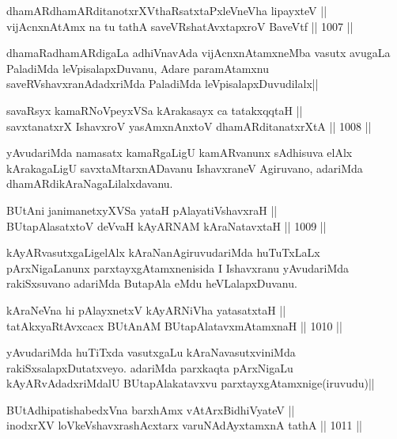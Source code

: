 \begin{shl}
dhamARdhamARditanotxrXV\s thaRsatxtaPxleVneVha lipayxteV || \\
vijAcnxnAtAmx na tu tathA saveVRshatAvxtapxroV BaveVtf ||  1007 ||  
\end{shl}

\begin{artha}
dhamaRadhamARdigaLa adhiVnavAda vijAcnxnAtamxneMba vasutx avugaLa PaladiMda leVpisalapxDuvanu, Adare paramAtamxnu saveRVshavxranAdadxriMda PaladiMda leVpisalapxDuvudilalx||
\end{artha}

\begin{shl}
savaRsyx kamaRNoV\s peyxVSa kArakasayx ca tatakxqqtaH || \\
savxtanatxrX IshavxroV yasAmxnAnxtoV dhamARditanatxrXtA ||  1008 ||  
\end{shl}

\begin{artha}
yAvudariMda namasatx kamaRgaLigU kamARvanunx sAdhisuva elAlx kArakagaLigU savxtaMtarxnADavanu IshavxraneV Agiruvano, adariMda dhamARdikAraNagaLilalxdavanu.
\end{artha}

\begin{shl}
BUtAni janimanetxyXVSa yataH pAlayatiVshavxraH || \\
BUtapAlasatxtoV deVvaH kAyARNAM kAraNatavxtaH ||  1009 ||  
\end{shl}

\begin{artha}
kAyARvasutxgaLigelAlx kAraNanAgiruvudariMda huTuTxLaLx pArxNigaLanunx parxtayxgAtamxnenisida I Ishavxranu yAvudariMda rakiSxsuvano adariMda ButapAla eMdu heVLalapxDuvanu.
\end{artha}


\begin{shl}
kAraNeVna hi pAlayxnetxV kAyARNiVha yatasatxtaH || \\
tatAkxyaRtAvxcacx BUtAnAM BUtapAlatavxmAtamxnaH ||  1010 ||  
\end{shl}

\begin{artha}
yAvudariMda huTiTxda vasutxgaLu kAraNavasutxviniMda rakiSxsalapxDutatxveyo. adariMda parxkaqta pArxNigaLu kAyARvAdadxriMdalU BUtapAlakatavxvu parxtayxgAtamxnige(iruvudu)||
\end{artha}

\begin{shl}
BUtAdhipatishabedxVna barxhAmx vA\s tArxBidhiVyateV || \\
inodxrXV loVkeVshavxrashAcxtarx varuNAdAyxtamxnA tathA ||  1011 ||  
\end{shl}
				

